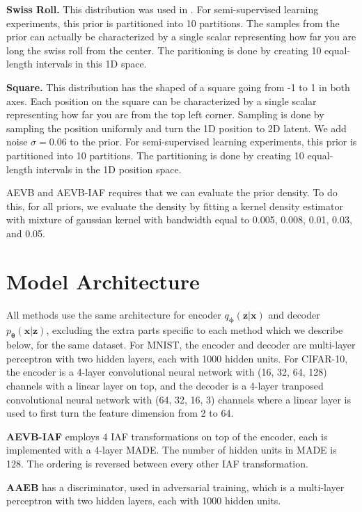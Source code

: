 \documentclass[letterpaper]{article} %
\newcommand{\bx}{\mathbf{x}}
\newcommand{\bz}{\mathbf{z}}
\let\oldtheta\theta
\renewcommand{\theta}{{\boldsymbol \oldtheta}}
\let\oldphi\phi
\renewcommand{\phi}{{\boldsymbol \oldphi}}
\begin{document}
\textbf{Swiss Roll.} This distribution was used in \cite{marsland2014swissroll}. For semi-supervised learning experiments, this prior is partitioned into 10 partitions. The samples from the prior can actually be characterized by a single scalar representing how far you are long the swiss roll from the center. The paritioning is done by creating 10 equal-length intervals in this 1D space.

\textbf{Square.} This distribution has the shaped of a square going from -1 to 1 in both axes. Each position on the square can be characterized by a single scalar representing how far you are from the top left corner. Sampling is done by sampling the position uniformly and turn the 1D position to 2D latent. We add noise $\sigma = 0.06$ to the prior. For semi-supervised learning experiments, this prior is partitioned into 10 partitions. The partitioning is done by creating 10 equal-length intervals in the 1D position space.

AEVB and AEVB-IAF requires that we can evaluate the prior density. To do this, for all priors, we evaluate the density by fitting a kernel density estimator with mixture of gaussian kernel with bandwidth equal to 0.005, 0.008, 0.01, 0.03, and 0.05. 


\section{Model Architecture}
\label{app:model_architecture}

All methods use the same architecture for encoder $q_\phi(\bz|\bx)$ and decoder $p_\theta(\bx|\bz)$, excluding the extra parts specific to each method which we describe below, for the same dataset. For MNIST, the encoder and decoder are multi-layer perceptron with two hidden layers, each with 1000 hidden units. For CIFAR-10, the encoder is a  4-layer convolutional neural network with (16, 32, 64, 128) channels with a linear layer on top, and the decoder is a 4-layer tranposed convolutional neural network with (64, 32, 16, 3) channels where a linear layer is used to first turn the feature dimension from 2 to 64. 

\textbf{AEVB-IAF} employs 4 IAF transformations on top of the encoder, each is implemented with a 4-layer MADE. The number of hidden units in MADE is 128. The ordering is reversed between every other IAF transformation. 

\textbf{AAEB} has a discriminator, used in adversarial training, which is a multi-layer perceptron with two hidden layers, each with 1000 hidden units.
\end{document}
